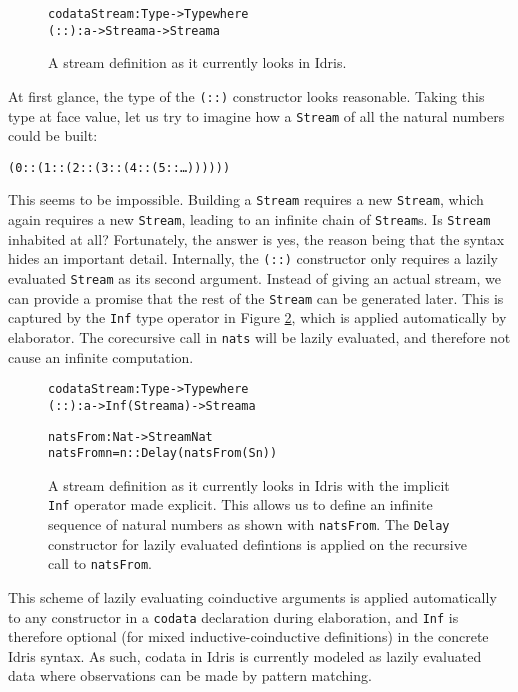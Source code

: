 \begin{figure}
\begin{alltt}
codata Stream : Type -> Type where
  (::) : a -> Stream a -> Stream a
\end{alltt}
\caption{A stream definition as it currently looks in Idris.}
\label{fig:stream_current}
\end{figure}

At first glance, the type of the \texttt{(::)} constructor looks reasonable. Taking this type at face value, let us try to imagine how a \texttt{Stream} of all the natural numbers could be built:

\begin{alltt}
(0 :: (1 :: (2 :: (3 :: (4 :: (5 :: \ldots))))))
\end{alltt}

This seems to be impossible. Building a \texttt{Stream} requires a new \texttt{Stream}, which again requires a new \texttt{Stream}, leading to an infinite chain of \texttt{Stream}s. Is \texttt{Stream} inhabited at all? Fortunately, the answer is yes, the reason being that the syntax hides an important detail. Internally, the \texttt{(::)} constructor only requires a lazily evaluated \texttt{Stream} as its second argument. Instead of giving an actual stream, we can provide a promise that the rest of the \texttt{Stream} can be generated later. This is captured by the \texttt{Inf} type operator in Figure \ref{fig:stream_current_Inf_and_natsFrom}, which is applied automatically by elaborator. The corecursive call in \texttt{nats} will be lazily evaluated, and therefore not cause an infinite computation.

\begin{figure}
\begin{alltt}
codata Stream : Type -> Type where
  (::) : a -> Inf (Stream a) -> Stream a

natsFrom : Nat -> Stream Nat
natsFrom n = n :: Delay (natsFrom (S n))
\end{alltt}
\caption{A stream definition as it currently looks in Idris with the implicit \texttt{Inf} operator made explicit. This allows us to define an infinite sequence of natural numbers as shown with \texttt{natsFrom}. The \texttt{Delay} constructor for lazily evaluated defintions is applied on the recursive call to \texttt{natsFrom}.}
\label{fig:stream_current_Inf_and_natsFrom}
\end{figure}

This scheme of lazily evaluating coinductive arguments is applied automatically to any constructor in a \texttt{codata} declaration during elaboration, and \texttt{Inf} is therefore optional (for mixed inductive-coinductive definitions) in the concrete Idris syntax. As such, codata in Idris is currently modeled as lazily evaluated data where observations can be made by pattern matching.

